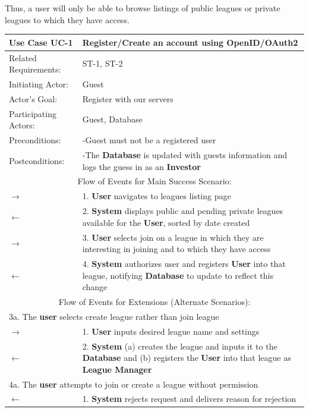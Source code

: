Thus, a user will only be able to browse listings of public leagues or private
leagues to which they have access. \\

\begin{centering}
\renewcommand\arraystretch{1.3} %
\label{UC-1}
\begin{longtable}{|p{1.2in} p{5in}|}

\hline
\bfseries{\color{color1}Use Case UC-1} &
\bfseries{\color{color1}Register/Create an account using OpenID/OAuth2} \\
\hline
Related Requirements: & ST-1, ST-2 \\
Initiating Actor:     & Guest \\
Actor's Goal:         & Register with our servers\\
Participating Actors: & Guest, Database\\
Preconditions:        & -Guest must not be a registered user\\
Postconditions:       & -The \textbf{Database} is updated with guests information and
                         logs the guess in as an \textbf{Investor}\\
\hline
\multicolumn{2}{|c|}{\color{color1}Flow of Events for Main Success Scenario:}\\
\hline
$\rightarrow$ & 1. \textbf{User} navigates to leagues listing page \\
$\leftarrow$ & 2. \textbf{System} displays public and pending private leagues available for the \textbf{User}, sorted by date created \\
$\rightarrow$ & 3. \textbf{User} selects join on a league in which they are interesting in joining and to which they have access \\
$\leftarrow$ & 4. \textbf{System} authorizes user and registers \textbf{User} into that league, notifying \textbf{Database} to update to reflect this change \\
\hline
\multicolumn{2}{|c|}{\color{color1}Flow of Events for Extensions (Alternate Scenarios):} \\
\hline
\multicolumn{2}{|p{6.2in}|}{3a. The \textbf{user} selects create league rather than join league} \\
\hline
$\rightarrow$ & 1.  \textbf{User} inputs desired league name and settings \\
$\leftarrow$ & 2. \textbf{System} (a) creates the league and inputs it to the \textbf{Database} and (b) registers the \textbf{User} into that league as \textbf{League Manager} \\
\hline
\multicolumn{2}{|p{6.2in}|}{4a. The \textbf{user} attempts to join or create a league without permission} \\
\hline
$\leftarrow$ & 1.  \textbf{System} rejects request and delivers reason for rejection \\
\hline
\end{longtable}
\end{centering}

